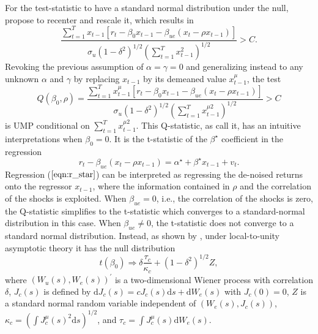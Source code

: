 \documentclass{article}
\begin{document}
For the test-statistic to have a standard normal distribution under the null, \citet{campbell2006efficient} propose to recenter and rescale it, which results in 
\begin{equation}
\frac{\sum_{t=1}^{T} x_{t-1}\left[r_{t}-\beta_{0} x_{t-1}-\beta_{u e}\left(x_{t}-\rho x_{t-1}\right)\right]}{\sigma_{u}\left(1-\delta^{2}\right)^{1 / 2}\left(\sum_{t=1}^{T} x_{t-1}^{2}\right)^{1 / 2}}>C.
\end{equation}
Revoking the previous assumption of $\alpha=\gamma=0$ and generalizing instead to any unknown  $\alpha$ and $\gamma$ by replacing $x_{t-1}$ by its demeaned value $x_{t-1}^{\mu}$, the test
\begin{equation}
Q\left(\beta_{0}, \rho\right)=\frac{\sum_{t=1}^{T} x_{t-1}^{\mu}\left[r_{t}-\beta_{0} x_{t-1}-\beta_{u e}\left(x_{t}-\rho x_{t-1}\right)\right]}{\sigma_{u}\left(1-\delta^{2}\right)^{1 / 2}\left(\sum_{t=1}^{T} x_{t-1}^{\mu 2}\right)^{1 / 2}}>C
\end{equation}
is UMP conditional on $\sum_{t=1}^{T} x_{t-1}^{\mu 2}$.
This Q-statistic, as \citet{campbell2006efficient} call it, has an intuitive interpretations when $\beta_{0} = 0$. It is the t-statistic of the $\beta^{\star}$ coefficient in the regression
 \begin{equation}
 \label{eqn:r_star}
r_{t}-\beta_{u e}\left(x_{t}-\rho x_{t-1}\right)=\alpha^{\star}+\beta^{\star} x_{t-1}+v_{t}. 
\end{equation}
Regression ($\ref{eqn:r_star}$) can be interpreted as regressing the de-noised returns onto the regressor $x_{t-1}$, where the information contained in $\rho$ and the correlation of the shocks is exploited.
When $\beta_{u e}=0$, i.e., the correlation of the shocks is zero, the Q-statistic simplifies to the t-statistic which converges to a standard-normal distribution in this case. When $\beta_{u e}\neq0$, the t-statistic does not converge to a standard normal distribution. Instead, as shown by \citet{elliott1994inference}, under local-to-unity asymptotic theory it has the null distribution 
\begin{equation}
\label{lua_t}
t\left(\beta_{0}\right) \Rightarrow \delta \frac{\tau_{c}}{\kappa_{c}}+\left(1-\delta^{2}\right)^{1 / 2} Z,
\end{equation}
where $\left(W_{u}(s), W_{e}(s)\right)^{\prime}$ is a two-dimensional Wiener process with correlation $\delta$, $J_{c}(s)$ is defined by $\mathrm{d} J_{c}(s)=c J_{c}(s) \mathrm{d} s+\mathrm{d} W_{e}(s)$ with $J_{c}(0)=0$, $Z$ is a standard normal random variable independent of $\left(W_{e}(s), J_{c}(s)\right)$, $\kappa_{c}=\left(\int J_{c}^{\mu}(s)^{2} \mathrm{d} s\right)^{1 / 2}$, and $\tau_{c}=\int J_{c}^{\mu}(s) \mathrm{d} W_{e}(s)$.
\end{document}
